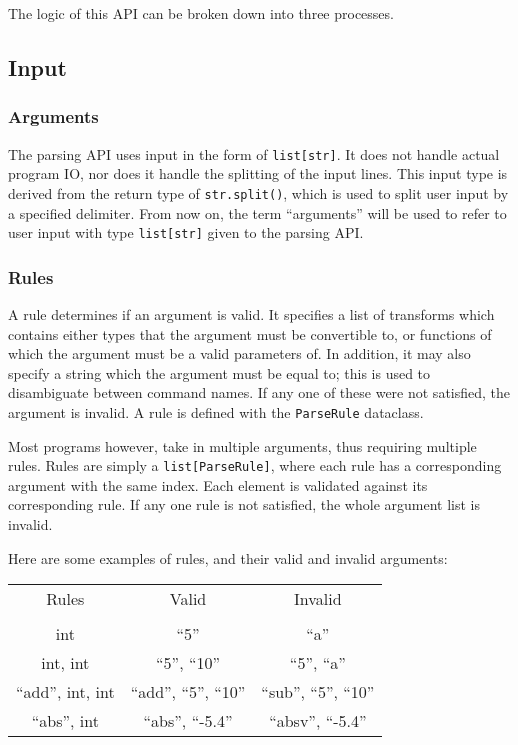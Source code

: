\documentclass{article}
\begin{document}
		The logic of this API can be broken down into three processes.

		\subsection{Input}
			\subsubsection{Arguments}
				The parsing API uses input in the form of \verb|list[str]|. It does not handle
				actual program IO, nor does it handle the splitting of the input lines. This
				input type is derived from the return type of \verb|str.split()|, which is
				used to split user input by a specified delimiter. From now on, the term
				``arguments'' will be used to refer to user input with type \verb|list[str]|
				given to the parsing API\@.

			\subsubsection{Rules}
				A rule determines if an argument is valid. It specifies a list of transforms which
				contains either types that the argument must be convertible to, or functions of
				which the argument must be a valid parameters of. In addition, it may also specify
				a string which the argument must be equal to; this is used to disambiguate between
				command names. If any one of these were not satisfied, the argument is invalid. A
				rule is defined with the \verb|ParseRule| dataclass.

				Most programs however, take in multiple arguments, thus requiring multiple rules.
				Rules are simply a \verb|list[ParseRule]|, where each rule has a corresponding
				argument with the same index. Each element is validated against its corresponding
				rule. If any one rule is not satisfied, the whole argument list is invalid.

				Here are some examples of rules, and their valid and invalid arguments:

				\begin{center}
					\begin{tabular}{c c c}
						Rules & Valid & Invalid \\
						\\
							int &
							``5'' &
							``a''
						\\
							int, int &
							``5'', ``10'' &
							``5'', ``a''
						\\
							``add'', int, int &
							``add'', ``5'', ``10'' &
							``sub'', ``5'', ``10''
						\\
							``abs'', int &
							``abs'', ``-5.4'' &
							``absv'', ``-5.4''
						\\
					\end{tabular}
				\end{center}
\end{document}
